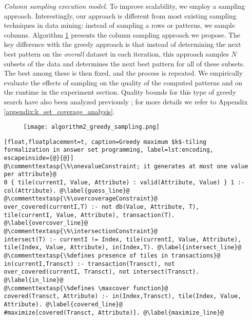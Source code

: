 \textit{Column sampling execution model.} To improve scalability, we employ a sampling approach. Interestingly, our approach is different from most existing sampling techniques in data mining: instead of sampling a rows or patterns, we sample columns. Algorithm \ref{sampling} presents the column sampling approach we propose. The key difference with the greedy approach is that instead of determining the 
next best pattern on the {\em overall} dataset in each iteration, this approach samples $N$ subsets of the data
and determines the next best pattern for all of these subsets. The best among these is then fixed,
and the process is repeated. We empirically evaluate the effects of sampling
on the quality of the computed patterns and on the runtime in the experiment section. \changesb Quality bounds for this type of greedy search have also been analyzed previously \parencite{max_k_set_cover1}; for more details we refer to Appendix \ref{appendix:k_set_coverage_analysis}. \changese
\begin{figure}[thb]
 \label{sampling}
\texttt{[image: algorithm2\_greedy\_sampling.png]}
\end{figure}

\begin{lstlisting}[float,floatplacement=t, caption=Greedy maximum $k$-tiling formalization in answer set programming, label=lst:encoding, escapeinside={@}{@}] 
@\commenttextasp{\%\onevalueConstraint; it generates at most one value per attribute}@
0 { tile(currentI, Value, Attribute) : valid(Attribute, Value) } 1 :- col(Attribute). @\label{guess_line}@
@\commenttextasp{\%\overcoverageConstraint}@
over_covered(currentI,T) :- not db(Value, Attribute, T), tile(currentI, Value, Attribute), transaction(T). @\label{overcover_line}@
@\commenttextasp{\%\intersectionConstraint}@
intersect(T) :- currentI != Index, tile(currentI, Value, Attribute), tile(Index, Value, Attribute), in(Index,T). @\label{intersect_line}@
@\commenttextasp{\%defines presence of tiles in transactions}@
in(currentI,Transct) :- transaction(Transct), not over_covered(currentI, Transct), not intersect(Transct). @\label{in_line}@
@\commenttextasp{\%defines \maxcover function}@
covered(Transct, Attribute) :- in(Index,Transct), tile(Index, Value, Attribute). @\label{covered_line}@
#maximize[covered(Transct, Attribute)]. @\label{maximize_line}@
\end{lstlisting}

